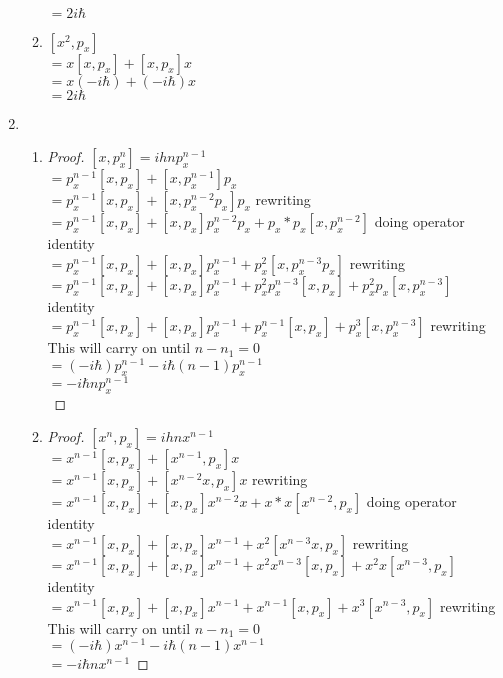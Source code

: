 \documentclass{article}
\begin{document}
\begin{enumerate}
\begin{enumerate}
    \\ $=2i\hbar$
    \item $[x^2,p_x]$
    \\ $=x[x,p_x]+[x,p_x]x$
    \\ $=x(-i\hbar)+(-i\hbar)x$
    \\ $=2i\hbar$
    \end{enumerate}
\item
    \begin{enumerate}
    \item \begin{proof} $[x,p_x^n]=ihnp_x^{n-1}$
    \\ $=p_x^{n-1}[x,p_x]+[x,p_x^{n-1}]p_x$
    \\ $=p_x^{n-1}[x,p_x]+[x,p_x^{n-2}p_x]p_x$ rewriting
    \\ $=p_x^{n-1}[x,p_x]+[x,p_x]p_x^{n-2}p_x+p_x*p_x[x,p_x^{n-2}]$ doing operator identity
    \\ $=p_x^{n-1}[x,p_x]+[x,p_x]p_x^{n-1}+p_x^2[x,p_x^{n-3}p_x]$ rewriting
    \\ $=p_x^{n-1}[x,p_x]+[x,p_x]p_x^{n-1}+p_x^2p_x^{n-3}[x,p_x]+p_x^2p_x[x,p_x^{n-3}]$ identity
    \\ $=p_x^{n-1}[x,p_x]+[x,p_x]p_x^{n-1}+p_x^{n-1}[x,p_x]+p_x^3[x,p_x^{n-3}]$ rewriting
    \\ This will carry on until $n-n_1=0$
    \\ $=(-i\hbar)p_x^{n-1}-i\hbar(n-1)p_x^{n-1}$
    \\ $=-i\hbar np_x^{n-1}$
    \\ \end{proof}
    \item \begin{proof} $[x^n,p_x]=ihnx^{n-1}$
    \\ $=x^{n-1}[x,p_x]+[x^{n-1},p_x]x$
    \\ $=x^{n-1}[x,p_x]+[x^{n-2}x,p_x]x$ rewriting
    \\ $=x^{n-1}[x,p_x]+[x,p_x]x^{n-2}x+x*x[x^{n-2},p_x]$ doing operator identity
    \\ $=x^{n-1}[x,p_x]+[x,p_x]x^{n-1}+x^2[x^{n-3}x,p_x]$ rewriting
    \\ $=x^{n-1}[x,p_x]+[x,p_x]x^{n-1}+x^2x^{n-3}[x,p_x]+x^2x[x^{n-3},p_x]$ identity
    \\ $=x^{n-1}[x,p_x]+[x,p_x]x^{n-1}+x^{n-1}[x,p_x]+x^3[x^{n-3},p_x]$ rewriting
    \\ This will carry on until $n-n_1=0$
    \\ $=(-i\hbar)x^{n-1}-i\hbar(n-1)x^{n-1}$
    \\ $=-i\hbar nx^{n-1}$

\end{proof}
\end{enumerate}
\end{enumerate}
\end{document}
